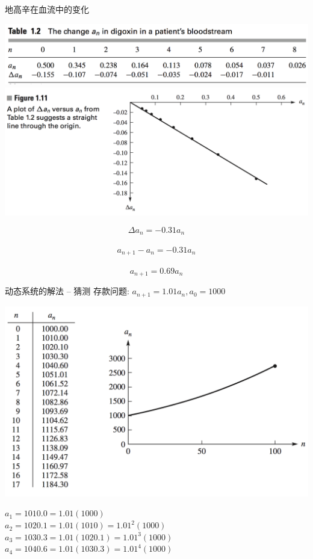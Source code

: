 \documentclass[UTF8]{ctexbeamer}
\begin{document}
\begin{frame}{地高辛在血流中的变化}
  \begin{center}
    \includegraphics[width=.8\textwidth{}]{digoxin-table.png}\\
    \includegraphics[width=.8\textwidth{}]{digoxin-fig.png}
  \end{center}
\[
\Delta a_n = -0.31a_n
\]\\[-20pt]
\[
a_{n+1} -  a_n = -0.31a_n
\]\\[-20pt]
\[
a_{n+1} = 0.69a_n
\]
\end{frame}

\begin{frame}{动态系统的解法 -- 猜测}
  存款问题: $a_{n+1} = 1.01a_n, a_0 = 1000$
  \begin{center}
    \includegraphics[width=.4\textwidth{}]{saving.png}
  \end{center}

$a_1 = 1010.0 = 1.01(1000)$\\
$a_2 = 1020.1 = 1.01(1010) = 1.01^2 (1000)$\\
$a_3 = 1030.3 = 1.01(1020.1) = 1.01^3 (1000)$\\
$a_4 = 1040.6 = 1.01(1030.3) = 1.01^4 (1000)$
\end{frame}
\end{document}

